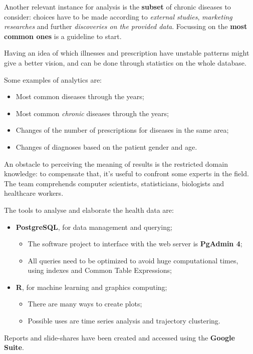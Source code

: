Another relevant instance for analysis is the \textbf{subset} of chronic diseases to consider: choices have to be made according to \textit{external studies}, \textit{marketing researches} and further \textit{discoveries on the provided data}. Focussing on the \textbf{most common ones} is a guideline to start.

Having an idea of which illnesses and prescription have unstable patterns might give a better vision, and can be done through statistics on the whole database. 

Some examples of analytics are:
\begin{itemize}
	\item Most common diseases through the years;
	\item Most common \textit{chronic} diseases through the years;
	\item Changes of the number of prescriptions for diseases in the same area;
	\item Changes of diagnoses based on the patient gender and age.
\end{itemize}

An obstacle to perceiving the meaning of results is the restricted domain knowledge: to compensate that, it's useful to confront some experts in the field. The team comprehends computer scientists, statisticians, biologists and healthcare workers.

The tools to analyse and elaborate the health data are:
\begin{itemize}
	\item \textbf{PostgreSQL}, for data management and querying;
		\begin{itemize}
			\item The software project to interface with the web server is \textbf{PgAdmin 4};
			\item All queries need to be optimized to avoid huge computational times, using indexes and Common Table Expressions;
		\end{itemize}
	\item \textbf{R}, for machine learning and graphics computing;
	\begin{itemize}
		\item There are many ways to create plots;
		\item Possible uses are time series analysis and trajectory clustering.
	\end{itemize}
\end{itemize}

Reports and slide-shares have been created and accessed using the \textbf{Google Suite}.

